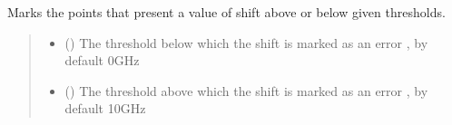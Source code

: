 \documentclass[letterpaper,10pt,english]{sphinxmanual}
\begin{document}
\begin{fulllineitems}
\begin{fulllineitems}
\begin{quote}
\begin{description}
\begin{itemize}
\end{itemize}

\end{description}\end{quote}

\end{fulllineitems}


\begin{fulllineitems}
\label{\detokenize{source/_autosummary/HDF5_BLS_treat.Treat:HDF5_BLS_treat.Treat.mark_errors_shift}}
\pysigstartsignatures
\pysiglinewithargsret
{}
{\sphinxparamcomma {}}
{}
\pysigstopsignatures
\sphinxAtStartPar
Marks the points that present a value of shift above or below given thresholds.
\begin{quote}\begin{description}
\begin{itemize}
\item {} 
\sphinxAtStartPar
{} (\sphinxstyleliteralemphasis{\sphinxupquote{, }}) \textendash{} The threshold below which the shift is marked as an error , by default 0GHz

\item {} 
\sphinxAtStartPar
{} (\sphinxstyleliteralemphasis{\sphinxupquote{, }}) \textendash{} The threshold above which the shift is marked as an error , by default 10GHz

\end{itemize}

\end{description}\end{quote}

\end{fulllineitems}



\end{fulllineitems}
\end{document}
